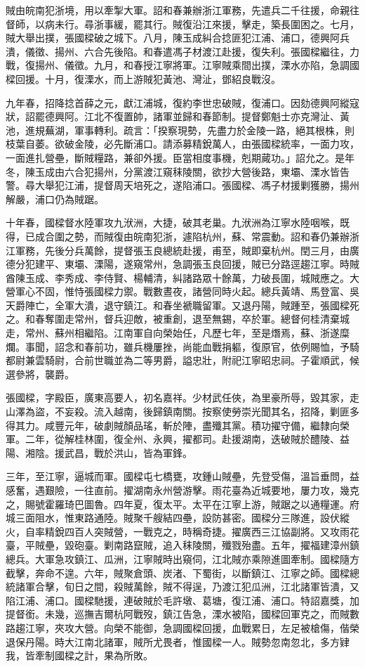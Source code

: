 \begin{pinyinscope}
賊由皖南犯浙境，用以牽掣大軍。詔和春兼辦浙江軍務，先遣兵二千往援，命親往督師，以病未行。尋浙事緩，罷其行。賊復沿江來援，擊走，築長圍困之。七月，賊大舉出撲，張國樑破之城下。八月，陳玉成糾合捻匪犯江浦、浦口，德興阿兵潰，儀徵、揚州、六合先後陷。和春遣馮子材渡江赴援，復失利。張國樑繼往，力戰，復揚州、儀徵。九月，和春授江寧將軍。江寧賊乘間出撲，溧水亦陷，急調國樑回援。十月，復溧水，而上游賊犯黃池、灣沚，鄧紹良戰沒。

九年春，招降捻首薛之元，獻江浦城，復約李世忠破賊，復浦口。因劾德興阿縱寇狀，詔罷德興阿。江北不復置帥，諸軍並歸和春節制。提督鄭魁士亦克灣沚、黃池，進規蕪湖，軍事轉利。疏言：「揆察現勢，先盡力於金陵一路，絕其根株，則枝葉自萎。欲破金陵，必先斷浦口。請添募精銳萬人，由張國樑統率，一面力攻，一面進扎營壘，斷賊糧路，兼卻外援。臣當相度事機，剋期蕆功。」詔允之。是年冬，陳玉成由六合犯揚州，分黨渡江窺秣陵關，欲抄大營後路，東壩、溧水皆告警。尋大舉犯江浦，提督周天培死之，遂陷浦口。張國樑、馮子材援剿獲勝，揚州解嚴，浦口仍為賊踞。

十年春，國樑督水陸軍攻九洑洲，大捷，破其老巢。九洑洲為江寧水陸咽喉，既得，已成合圍之勢，而賊復由皖南犯浙，遽陷杭州，蘇、常震動。詔和春仍兼辦浙江軍務，先後分兵萬餘，提督張玉良總統赴援，甫至，賊即棄杭州。閏三月，由廣德分犯建平、東壩、溧陽，遂窺常州，急調張玉良回援，賊已分路逕趨江寧。時賊酋陳玉成、李秀成、李侍賢、楊輔清，糾諸路眾十餘萬，力破長圍，城賊應之。大營軍心不固，惟恃張國樑力禦。戰數晝夜，諸營同時火起。總兵黃靖、馬登富、吳天爵陣亡，全軍大潰，退守鎮江。和春坐褫職留軍。又退丹陽，賊踵至，張國樑死之。和春奪圍走常州，督兵迎敵，被重創，退至無錫，卒於軍。總督何桂清棄城走，常州、蘇州相繼陷。江南軍自向榮始任，凡歷七年，至是熸焉，蘇、浙遂糜爛。事聞，詔念和春前功，雖兵機屢挫，尚能血戰捐軀，復原官，依例賜恤，予騎都尉兼雲騎尉，合前世職並為二等男爵，謚忠壯，附祀江寧昭忠祠。子霍順武，候選參將，襲爵。

張國樑，字殿臣，廣東高要人，初名嘉祥。少材武任俠，為里豪所辱，毀其家，走山澤為盜，不妄殺。流入越南，後歸鎮南關。按察使勞崇光聞其名，招降，剿匪多得其力。咸豐元年，破劇賊顏品瑤，斬於陣，盡殲其黨。積功擢守備，繼隸向榮軍。二年，從解桂林圍，復全州、永興，擢都司。赴援湖南，迭破賊於醴陵、益陽、湘陰。援武昌，戰於洪山，皆為軍鋒。

三年，至江寧，逼城而軍。國樑屯七橋甕，攻鍾山賊壘，先登受傷，溫旨垂問，益感奮，遇艱險，一往直前。擢湖南永州營游擊。雨花臺為近城要地，屢力攻，幾克之，賜號霍羅琦巴圖魯。四年夏，復太平。太平在江寧上游，賊踞之以通糧運。府城三面阻水，惟東路通陸。賊聚千艘結四壘，設防甚密。國樑分三隊進，設伏縱火，自率精銳四百人突賊營，一戰克之，時稱奇捷。擢廣西三江協副將。又攻雨花臺，平賊壘，毀砲臺。剿南路竄賊，追入秣陵關，殲戮殆盡。五年，擢福建漳州鎮總兵。大軍急攻鎮江、瓜洲，江寧賊時出窺伺，江北賊亦乘隙進圖牽制。國樑隨方截擊，奔命不遑。六年，賊聚倉頭、炭渚、下蜀街，以斷鎮江、江寧之師。國樑總統諸軍合擊，旬日之間，殺賊萬餘，賊不得逞，乃渡江犯瓜洲，江北諸軍皆潰，又陷江浦、浦口。國樑馳援，連破賊於毛許墩、葛塘，復江浦、浦口。特詔嘉獎，加提督銜。未幾，巡撫吉爾杭阿戰歿，鎮江告急，溧水被陷，國樑回軍克之，而賊數路趨江寧，夾攻大營。向榮不能御，急調國樑回援，血戰累日，左足被槍傷，偕榮退保丹陽。時大江南北諸軍，賊所尤畏者，惟國樑一人。賊勢忽南忽北，多方肄我，皆牽制國樑之計，果為所敗。


\end{pinyinscope}
